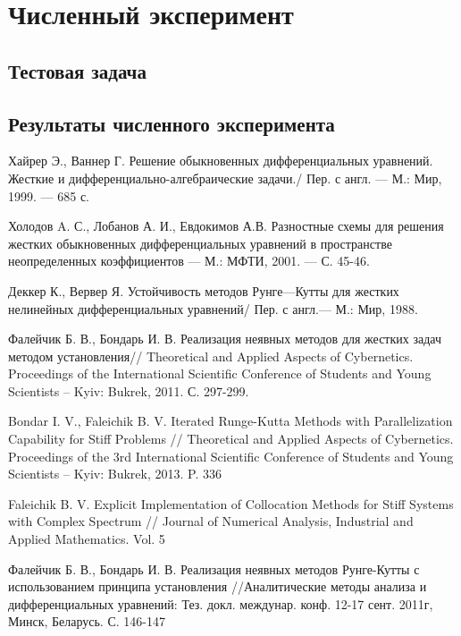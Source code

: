\documentclass[a4paper,14pt]{extreport}
\begin{document}
  
  \chapter{Численный эксперимент}
  \label{c:numer_ex}
  
  \section{Тестовая задача}
  \label{s:test_problem}
  
  \section{Результаты численного эксперимента}
  \label{s:results}
  
  
\newpage

\begin{thebibliography}{99}

Хайрер Э., Ваннер Г.  Решение обыкновенных дифференциальных уравнений. Жесткие и дифференциально-алгебраические задачи./ Пер. с англ. — М.: Мир, 1999. — 685 с.

Холодов A. С., Лобанов А. И., Евдокимов А.В. Разностные схемы для решения жестких обыкновенных дифференциальных уравнений в пространстве неопределенных коэффициентов — М.: МФТИ, 2001. — С. 45-46.

Деккер К., Вервер Я. Устойчивость методов Рунге—Кутты для жестких нелинейных дифференциальных уравнений/ Пер. с англ.— М.: Мир, 1988.

Фалейчик Б. В., Бондарь И. В. Реализация неявных методов для жестких задач методом установления// Theoretical and Applied Aspects of Cybernetics. Proceedings of the International Scientific Conference of Students and Young Scientists -- Kyiv: Bukrek, 2011. С. 297-299.

Bondar I. V., Faleichik B. V. Iterated Runge-Kutta Methods with Parallelization Capability for Stiff Problems // Theoretical and Applied Aspects of Cybernetics. Proceedings of the 3rd International Scientific Conference of Students and Young Scientists -- Kyiv: Bukrek, 2013. P. 336 

Faleichik B. V. Explicit Implementation of Collocation Methods for Stiff Systems with Complex Spectrum // Journal of Numerical Analysis, Industrial and Applied Mathematics. Vol. 5

Фалейчик Б. В., Бондарь И. В. Реализация неявных методов Рунге-Кутты с использованием принципа установления //Аналитические методы анализа и дифференциальных уравнений: Тез. докл. междунар. конф. 12-17 сент. 2011г, Минск, Беларусь. С. 146-147


\end{thebibliography}
\end{document}
